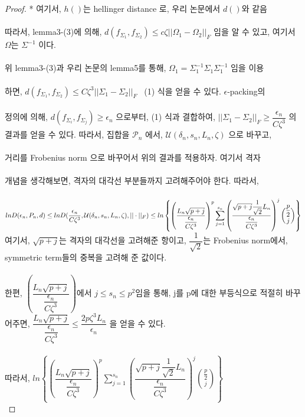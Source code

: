 \begin{proof}
\noindent
* 여기서, $h()$는 hellinger distance 로, 우리 논문에서 $d()$와 같음\\
\\
따라서, lemma3-(3)에 의해,
$d(f_{\Sigma_1},f_{\Sigma_2}) \leq c\zeta||\Omega_1-\Omega_2||_F$ 임을 알 수 있고, 여기서 $\Omega$는 $\Sigma^{-1}$ 이다.\\
\\
위 lemma3-(3)과 우리 논문의 lemma5를 통해, $\Omega_1=\Sigma_1^{-1}\Sigma_1\Sigma_1^{-1}$ 임을 이용\\
\\
하면,
$d(f_{\Sigma_1},f_{\Sigma_2}) \leq C\zeta^3||\Sigma_1-\Sigma_2||_F$ \ (1) 식을 얻을 수 있다.
\noindent
$\epsilon$-packing의\\
\\
정의에 의해, $d(f_{\Sigma_{i}},f_{\Sigma_{j}})\geq \epsilon_n$ 으로부터, (1) 식과 결합하여, $||\Sigma_1-\Sigma_2||_F \geq \dfrac{\epsilon_n}{C\zeta^3}$ 의\\
결과를 얻을 수 있다. 따라서, 집합을 $\mathcal{P}_n$ 에서, $\mathcal{U}(\delta_n,s_n,L_n,\zeta)$ 으로 바꾸고,\\
\\
거리를 Frobenius norm 으로 바꾸어서 위의 결과를 적용하자. 여기서 격자\\
\\
개념을 생각해보면, 격자의 대각선 부분들까지 고려해주어야 한다. 따라서,\\
\\
$lnD(\epsilon_n,P_n,d) \leq lnD(\dfrac{\epsilon_n}{C\zeta^3},\mathcal{U}(\delta_n,s_n,L_n,\zeta),||\cdot||_F)\\
\\
\leq ln\left\{\left(\dfrac{L_n\sqrt{p+j}}{\dfrac{\epsilon_n}{C\zeta^3}}\right)^p \displaystyle \sum\limits_{j=1}^{s_n}\left(\dfrac{\sqrt{p+j}\dfrac{1}{\sqrt{2}}L_n}{\dfrac{\epsilon_n}{C\zeta^3}}\right)^{j}{\dfrac{p}{2} \displaystyle \choose j} \right\}$\\
여기서, $\sqrt{p+j}$는 격자의 대각선을 고려해준 항이고, $\dfrac{1}{\sqrt{2}}$는 Frobenius norm에서, symmetric term들의 중복을 고려해 준 값이다.\\
\\
한편, $\left(\dfrac{L_n\sqrt{p+j}}{\dfrac{\epsilon_n}{C\zeta^3}}\right)$에서 $j\leq s_n \leq p^2$임을 통해, j를 p에 대한 부등식으로 적절히 바꾸어주면,
$\dfrac{L_n\sqrt{p+j}}{\dfrac{\epsilon_n}{C\zeta^3}}\leq \dfrac{2p\zeta^3L_n}{\epsilon_n}$ 을 얻을 수 있다.\\
\\ 
따라서, $ln\left\{\left(\dfrac{L_n\sqrt{p+j}}{\dfrac{\epsilon_n}{C\zeta^3}}\right)^p \displaystyle \sum\limits_{j=1}^{s_n}\left(\dfrac{\sqrt{p+j}\dfrac{1}{\sqrt{2}}L_n}{\dfrac{\epsilon_n}{C\zeta^3}}\right)^{j}{\dfrac{p}{2} \choose j} \right \}$\\

\end{proof}
